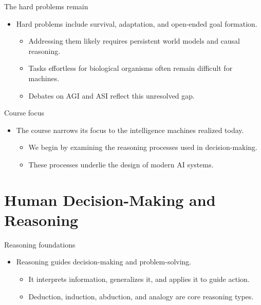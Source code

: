 \documentclass[12pt]{beamer}
\begin{document}
\begin{frame}{The hard problems remain}
  \begin{itemize}
    \item Hard problems include survival, adaptation, and open-ended goal formation.
      \begin{itemize}
        \item Addressing them likely requires persistent world models and causal reasoning.
        \item Tasks effortless for biological organisms often remain difficult for machines.
        \item Debates on AGI and ASI reflect this unresolved gap.
      \end{itemize}
  \end{itemize}
\end{frame}

\begin{frame}{Course focus}
  \begin{itemize}
    \item The course narrows its focus to the intelligence machines realized today.
      \begin{itemize}
        \item We begin by examining the reasoning processes used in decision-making.
        \item These processes underlie the design of modern AI systems.
      \end{itemize}
  \end{itemize}
\end{frame}

\section{Human Decision-Making and Reasoning}

\begin{frame}{Reasoning foundations}
  \begin{itemize}
    \item Reasoning guides decision-making and problem-solving.
      \begin{itemize}
        \item It interprets information, generalizes it, and applies it to guide action.
        \item Deduction, induction, abduction, and analogy are core reasoning types.
      \end{itemize}
  \end{itemize}
\end{frame}
\end{document}
